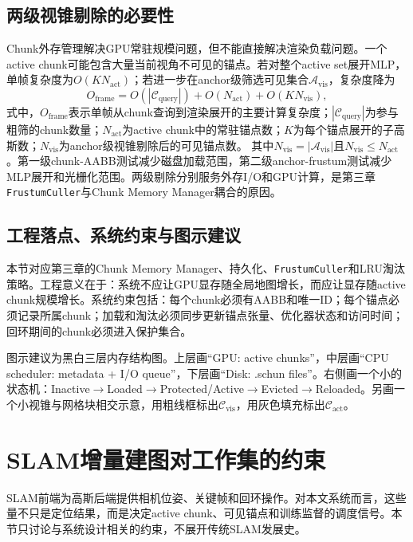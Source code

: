 \subsection{两级视锥剔除的必要性}

Chunk外存管理解决GPU常驻规模问题，但不能直接解决渲染负载问题。一个active chunk可能包含大量当前视角不可见的锚点。若对整个active set展开MLP，单帧复杂度为$O(KN_{\mathrm{act}})$；若进一步在anchor级筛选可见集合$\mathcal{A}_{\mathrm{vis}}$，复杂度降为
\begin{equation}
O_{\mathrm{frame}}
=
O(|\mathcal{C}_{\mathrm{query}}|)
+
O(N_{\mathrm{act}})
+
O(KN_{\mathrm{vis}}),
\end{equation}
式中，$O_{\mathrm{frame}}$表示单帧从chunk查询到渲染展开的主要计算复杂度；$|\mathcal{C}_{\mathrm{query}}|$为参与粗筛的chunk数量；$N_{\mathrm{act}}$为active chunk中的常驻锚点数；$K$为每个锚点展开的子高斯数；$N_{\mathrm{vis}}$为anchor级视锥剔除后的可见锚点数。
其中$N_{\mathrm{vis}}=|\mathcal{A}_{\mathrm{vis}}|$且$N_{\mathrm{vis}}\leq N_{\mathrm{act}}$。第一级chunk-AABB测试减少磁盘加载范围，第二级anchor-frustum测试减少MLP展开和光栅化范围。两级剔除分别服务外存I/O和GPU计算，是第三章\texttt{FrustumCuller}与Chunk Memory Manager耦合的原因。

\subsection{工程落点、系统约束与图示建议}

本节对应第三章的Chunk Memory Manager、\schun 持久化、\texttt{FrustumCuller}和LRU淘汰策略。工程意义在于：系统不应让GPU显存随全局地图增长，而应让显存随active chunk规模增长。系统约束包括：每个chunk必须有AABB和唯一ID；每个锚点必须记录所属chunk；加载和淘汰必须同步更新锚点张量、优化器状态和访问时间；回环期间的chunk必须进入保护集合。

图示建议为黑白三层内存结构图。上层画``GPU: active chunks''，中层画``CPU scheduler: metadata + I/O queue''，下层画``Disk: .schun files''。右侧画一个小的状态机：Inactive$\rightarrow$Loaded$\rightarrow$Protected/Active$\rightarrow$Evicted$\rightarrow$Reloaded。另画一个小视锥与网格块相交示意，用粗线框标出$\mathcal{C}_{\mathrm{vis}}$，用灰色填充标出$\mathcal{C}_{\mathrm{act}}$。

\section{SLAM增量建图对工作集的约束}

SLAM前端为高斯后端提供相机位姿、关键帧和回环操作。对本文系统而言，这些量不只是定位结果，而是决定active chunk、可见锚点和训练监督的调度信号。本节只讨论与系统设计相关的约束，不展开传统SLAM发展史。

